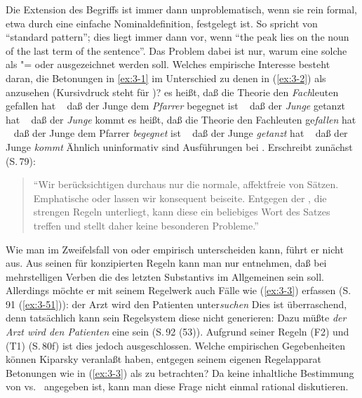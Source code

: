 \documentclass[output=paper]{langsci/langscibook}
\begin{document}
Die Extension des Begriffs  ist immer dann
unproblematisch, wenn sie rein formal, etwa durch eine einfache
Nominaldefinition, festgelegt ist. So spricht \zb \citet[521ff]{Bartsch76} von "`standard  pattern"'; dies liegt immer dann vor, wenn "`the  peak lies on the noun of the last
term of the sentence"'. Das Problem dabei ist nur, warum eine solche  als "= oder 
ausgezeichnet werden soll. Welches empirische Interesse besteht
daran, die Betonungen in \eqref{ex:3-1} im Unterschied zu denen in (\ref{ex:3-2}) als
 anzusehen (Kursivdruck steht für )?
\eal \label{ex:3-1}
\ex
\label{ex:3-1a}
es heißt, daß die Theorie den \textit{Fach}leuten gefallen hat
\ex
\label{ex:3-1b}
~\hphantom{es heißt} daß der Junge dem \textit{Pfarrer} begegnet ist
\ex
\label{ex:3-1c}
~\hphantom{es heißt} daß der \textit{Junge} getanzt hat
\ex
\label{ex:3-1d}
~\hphantom{es heißt} daß der \textit{Junge} kommt
\zl
\eal \label{ex:3-2}
\ex
\label{ex:3-2a}
es heißt, daß die Theorie den Fachleuten ge\textit{fallen} hat
\ex
\label{ex:3-2b}
~\hphantom{es heißt} daß der Junge dem Pfarrer \textit{begegnet} ist
\ex
\label{ex:3-2c}
~\hphantom{es heißt} daß der Junge \textit{getanzt} hat
\ex
\label{ex:3-2d}
~\hphantom{es heißt} daß der Junge \textit{kommt}
\zl
Ähnlich uninformativ sind \zb Ausführungen bei \citet[79ff]{Kiparsky66}. Er\linebreak schreibt zunächst (S.\,79):
\begin{quotation}
  "`Wir berücksichtigen durchaus nur die normale, affektfreie 
  von Sätzen. Emphatische oder  lassen wir
  konsequent beiseite. Entgegen der , die strengen
  Regeln unterliegt, kann diese ein beliebiges Wort des Satzes treffen
  und stellt daher keine besonderen Probleme."'
\end{quotation}
Wie man im Zweifelsfall  von 
oder   empirisch unterscheiden kann,
führt er nicht aus. Aus seinen für  konzipierten Regeln kann man nur entnehmen, daß bei mehrstelligen Verben die  des letzten Substantivs im Allgemeinen  sein soll. Allerdings möchte er mit seinem Regelwerk auch Fälle wie
(\ref{ex:3-3}) erfassen (S.\,91 (\ref{ex:3-51})):
\ea
\label{ex:3-3}
der Arzt wird den Patienten unter\textit{suchen}
\z
Dies ist überraschend, denn tatsächlich kann sein Regelsystem diese
 nicht generieren: Dazu müßte \textit{der Arzt wird den Patienten} 
eine  sein (S.\,92 (53)). Aufgrund seiner Regeln (F2) und
(T1) (S.\,80f) ist dies jedoch ausgeschlossen. Welche empirischen
Gegebenheiten können Kiparsky veranlaßt haben, entgegen seinem eigenen
Regelapparat Betonungen wie in (\ref{ex:3-3}) als  zu betrachten?
Da keine inhaltliche Bestimmung von  vs.\
  angegeben ist, kann man diese Frage
nicht einmal rational diskutieren.
\end{document}
